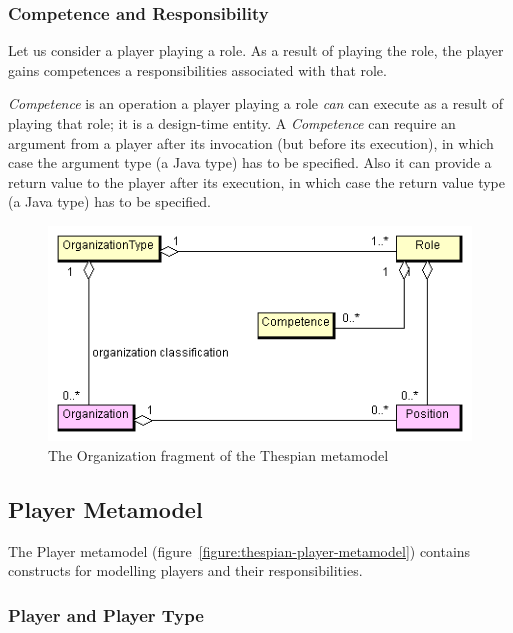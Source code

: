 \subsubsection*{Competence and Responsibility}

Let us consider a player playing a role.
As a result of playing the role, the player gains competences a responsibilities associated with that role.

\textit{Competence} is an operation a player playing a role \textit{can} can execute as a result of playing that role; it is a design-time entity.
A \textit{Competence} can require an argument from a player after its invocation (but before its execution), in which case the argument type (a Java type) has to be specified.
Also it can provide a return value to the player after its execution, in which case the return value type (a Java type) has to be specified.

\begin{figure}[ht]
	\centering
	\includegraphics[width=\textwidth]{images/thespian/organization-metamodel.png}
	\caption{The Organization fragment of the Thespian metamodel}
	\label{figure:thespian-organization-metamodel}
\end{figure}

\subsection{Player Metamodel}

The Player metamodel (figure~\ref{figure:thespian-player-metamodel}) contains constructs for modelling players and their responsibilities.

\subsubsection*{Player and Player Type}

